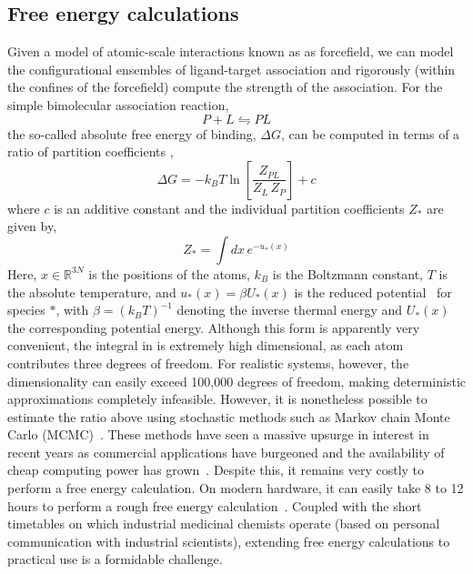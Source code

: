 \subsection{Free energy calculations}
%
Given a model of atomic-scale interactions known as as forcefield, we can model the configurational ensembles of ligand-target association and rigorously (within the confines of the forcefield) compute the strength of the association.
%
For the simple bimolecular association reaction,
%
\begin{equation} \label{eq:bimolecular-association}
    P + L \leftrightharpoons PL 
\end{equation}
%
the so-called absolute free energy of binding, $\Delta G$, can be computed in terms of a ratio of partition coefficients \cite{Gilson1997},
%
\begin{equation} \label{eq:1}
    \Delta G = - k_B T \ln \left[ \frac{Z_{PL}}{Z_L \, Z_P} \right] + c
\end{equation}
%
where $c$ is an additive constant and the individual partition coefficients $Z_*$ are given by,
%
\begin{equation}\label{eq:2}
    Z_* = \int dx \, e^{-u_*(x)}
\end{equation}
%
Here, $x \in \mathbb{R}^{3N}$ is the positions of the atoms, $k_B$ is the Boltzmann constant, $T$ is the absolute temperature, and $u_*(x) = \beta U_*(x)$ is the reduced potential~\cite{Shirts2008} for species $*$, with $\beta = (k_B T)^{-1}$ denoting the inverse thermal energy and $U_*(x)$ the corresponding potential energy.
%
Although this form is apparently very convenient, the integral in \label{eq:1} is extremely high dimensional, as each atom contributes three degrees of freedom. 
%
For realistic systems, however, the dimensionality can easily exceed 100,000 degrees of freedom, making deterministic approximations completely infeasible.
%
However, it is nonetheless possible to estimate the ratio above using stochastic methods such as Markov chain Monte Carlo (MCMC)~\cite{Liu2004}.
%
These methods have seen a massive upsurge in interest in recent years as commercial applications have burgeoned and the availability of cheap computing power has grown~\cite{Wang2015}.
%
Despite this, it remains very costly to perform a free energy calculation. 
%
On modern hardware, it can easily take 8 to 12 hours to perform a rough free energy calculation~\cite{Wang2015}.
%
Coupled with the short timetables on which industrial medicinal chemists operate (based on personal communication with industrial scientists), extending free energy calculations to practical use is a formidable challenge.
%
